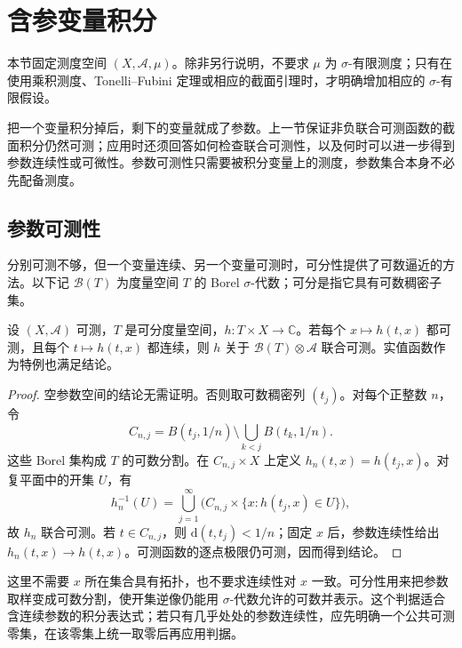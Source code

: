 \section{含参变量积分}
\label{b1:sec:0704}

本节固定测度空间 \((X,\mathcal A,\mu)\)。除非另行说明，不要求 \(\mu\) 为 \(\sigma\)-有限测度；只有在使用乘积测度、Tonelli--Fubini 定理或相应的截面引理时，才明确增加相应的 \(\sigma\)-有限假设。

\ProseParagraphBreak

把一个变量积分掉后，剩下的变量就成了参数。上一节保证非负联合可测函数的截面积分仍然可测；应用时还须回答如何检查联合可测性，以及何时可以进一步得到参数连续性或可微性。参数可测性只需要被积分变量上的测度，参数集合本身不必先配备测度。

\subsection{参数可测性}
\label{b1:subsec:070401}

分别可测不够，但一个变量连续、另一个变量可测时，可分性提供了可数逼近的方法。以下记 \(\mathcal B(T)\) 为度量空间 \(T\) 的 Borel \(\sigma\)-代数；可分是指它具有可数稠密子集。

\begin{proposition}\label{b1:prop:caratheodory-joint-measurability}
设 \((X,\mathcal A)\) 可测，\(T\) 是可分度量空间，\(h:T\times X\rightarrow\mathbb C\)。若每个 \(x\mapsto h(t,x)\) 都可测，且每个 \(t\mapsto h(t,x)\) 都连续，则 \(h\) 关于 \(\mathcal B(T)\otimes\mathcal A\) 联合可测。实值函数作为特例也满足结论。
\end{proposition}
\begin{proof}
空参数空间的结论无需证明。否则取可数稠密列 \((t_j)\)。对每个正整数 \(n\)，令
\[
C_{n,j}=B(t_j,1/n)\setminus\bigcup_{k<j}B(t_k,1/n).
\]
这些 Borel 集构成 \(T\) 的可数分割。在 \(C_{n,j}\times X\) 上定义 \(h_n(t,x)=h(t_j,x)\)。对复平面中的开集 \(U\)，有
\[
h_n^{-1}(U)=\bigcup_{j=1}^{\infty}\bigl(C_{n,j}\times\{x:h(t_j,x)\in U\}\bigr),
\]
故 \(h_n\) 联合可测。若 \(t\in C_{n,j}\)，则 \(\mathrm{d}(t,t_j)<1/n\)；固定 \(x\) 后，参数连续性给出 \(h_n(t,x)\to h(t,x)\)。可测函数的逐点极限仍可测，因而得到结论。
\end{proof}

这里不需要 \(x\) 所在集合具有拓扑，也不要求连续性对 \(x\) 一致。可分性用来把参数取样变成可数分割，使开集逆像仍能用 \(\sigma\)-代数允许的可数并表示。这个判据适合含连续参数的积分表达式；若只有几乎处处的参数连续性，应先明确一个公共可测零集，在该零集上统一取零后再应用判据。

